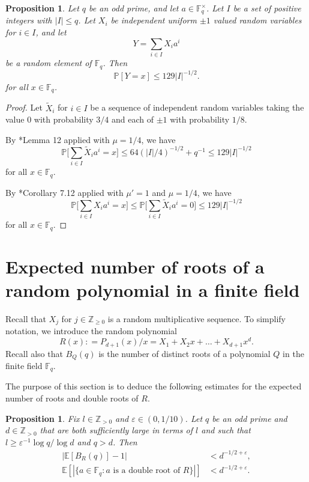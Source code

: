 \documentclass[12pt, notitlepage]{amsart}
\numberwithin{equation}{section}
\def\Z{\mathbb Z}
\def\P{\mathbb P}
\def\F{\mathbb F}
\def\E{\mathbb E}
\def\wt{\widetilde}
\newtheorem{proposition}[theorem]{Proposition}
\theoremstyle{remark}
\theoremstyle{definition}
\theoremstyle{remark}
\numberwithin{equation}{section}
\newcommand{\e}{\varepsilon}
\begin{document}
\begin{proposition}\label{pr:exceptional}
Let $q$ be an odd prime, and let $a\in\F_q^\times$.
Let $I$ be a set of positive integers with $|I|\le q$.
Let $X_i$ be independent uniform $\pm1$ valued random variables for $i\in I$, and let
\[
Y=\sum_{i\in I} X_i a^i
\]
be a random element of $\F_q$.
Then
\[
\P[Y=x]\le 129 |I|^{-1/2}.
\]
for all $x\in \F_q$.
\end{proposition}


\begin{proof}
	Let $\wt X_i$ for $i\in I$ be a sequence of independent random variables
	taking the value $0$ with probability $3/4$ and each of $\pm 1$ with
	probability $1/8$.
	
	By \cite{CJMS}*{Lemma 12} applied with $\mu=1/4$, we have
	\[
	\P\Big[\sum_{i\in I} \wt X_i a^i =x\Big]\le 64(|I|/4)^{-1/2}+q^{-1}
	\le 129 |I|^{-1/2}
	\]
	for all $x\in \F_q$.
	
	By \cite{TV-book}*{Corollary 7.12} applied with $\mu'=1$ and $\mu=1/4$, we have
	\[
	\P\Big[\sum_{i\in I} X_i a^i =x\Big]\le \P\Big[\sum_{i\in I} \wt X_i a^i =0\Big]
	\le 129 |I|^{-1/2}
	\]
	for all $x\in \F_q$.
\end{proof}


\section{Expected number of roots of a random polynomial in a finite field}
\label{sc:number-of-roots}

Recall that $X_j$ for $j\in\Z_{\ge 0}$ is a random multiplicative sequence.
To simplify notation, we introduce the random polynomial
\[R(x): = 
P_{d+1}(x)/x=X_1+X_2x+\ldots+X_{d+1} x^d.
\]
Recall also that $B_Q(q)$ is the number of distinct roots of a polynomial $Q$
in the finite field $\F_q$.

The purpose of this section is to deduce the following estimates for the expected number of roots and double roots of $R$.

\begin{proposition}\label{pr:number-roots-random-poly}
Fix $l\in\Z_{>0}$ and $\e\in(0,1/10)$.
Let $q$ be an odd prime and $d\in\Z_{>0}$ that are both sufficiently
large in terms of $l$ and such that $l\ge \e^{-1}\log q/\log d$ and $q>d$.
Then
\begin{align*}
|\E[B_R(q)]-1|&<d^{-1/2+\e},\\
\E[|\{a\in\F_q: \text{$a$ is a double root of $R$}\}|]&<d^{-1/2+\e}.
\end{align*}
\end{proposition}
\end{document}
